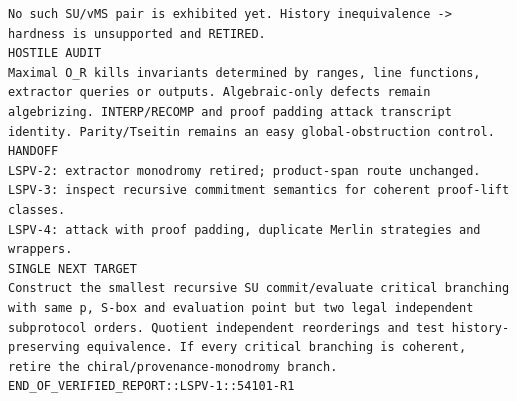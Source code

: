 \documentclass[11pt]{article}
\begin{document}
\begin{Verbatim}[breaklines=true,breakanywhere=true]
No such SU/vMS pair is exhibited yet. History inequivalence -> hardness is unsupported and RETIRED.
HOSTILE AUDIT
Maximal O_R kills invariants determined by ranges, line functions, extractor queries or outputs. Algebraic-only defects remain algebrizing. INTERP/RECOMP and proof padding attack transcript identity. Parity/Tseitin remains an easy global-obstruction control.
HANDOFF
LSPV-2: extractor monodromy retired; product-span route unchanged.
LSPV-3: inspect recursive commitment semantics for coherent proof-lift classes.
LSPV-4: attack with proof padding, duplicate Merlin strategies and wrappers.
SINGLE NEXT TARGET
Construct the smallest recursive SU commit/evaluate critical branching with same p, S-box and evaluation point but two legal independent subprotocol orders. Quotient independent reorderings and test history-preserving equivalence. If every critical branching is coherent, retire the chiral/provenance-monodromy branch.
END_OF_VERIFIED_REPORT::LSPV-1::54101-R1
\end{Verbatim}
\end{document}
